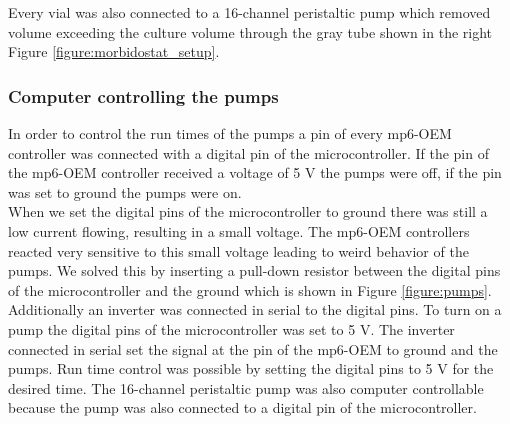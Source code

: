 Every vial was also connected to a 16-channel peristaltic pump which removed volume exceeding the culture volume through the gray tube shown in the right Figure \ref{figure:morbidostat_setup}. 

\subsubsection{Computer controlling the pumps}
In order to control the run times of the pumps a pin of every mp6-OEM controller was connected with a digital pin of the microcontroller. If the pin of the mp6-OEM controller received a voltage of 5 V the pumps were off, if the pin was set to ground the pumps were on. \\
When we set the digital pins of the microcontroller to ground there was still a low current flowing, resulting in a small voltage. The mp6-OEM controllers reacted very sensitive to this small voltage leading to weird behavior of the pumps. We solved this by inserting a pull-down resistor between the digital pins of the microcontroller and the ground which is shown in Figure \ref{figure:pumps}. Additionally an inverter was connected in serial to the digital pins. To turn on a pump the digital pins of the microcontroller was set to 5 V. The inverter connected in serial set the signal at the pin of the mp6-OEM to ground and the pumps. Run time control was possible by setting the digital pins to 5 V for the desired time.
The 16-channel peristaltic pump was also computer controllable because the pump was also connected to a digital pin of the microcontroller.
\label{section:pumps}

